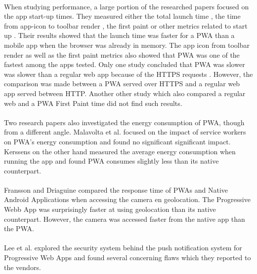\documentclass{kththesis}
\begin{document}
\paragraph{}
When studying performance, a large portion of the researched papers focused on the app start-up times. They measured either the total launch time\cite{YbergViktor2018NPaU} \cite{PWApossibleUnifer} \cite{Biorn-Hansen2}, the time from app-icon to toolbar render \cite{PWApossibleUnifer} \cite{Biorn-Hansen2}, the first paint \cite{bac_pwa_comparison} \cite{bac_pwa_performance} \cite{PWAapplicability} or other metrics related to start up \cite{bac_pwa_performance} \cite{bac_pwa_comparison}.
Their results showed that the launch time was faster for a PWA than a mobile app when the browser was already in memory. The app icon from toolbar render as well as the first paint metrics also showed that PWA was one of the fastest among the apps tested.\newline
Only one study concluded that PWA was slower was slower than a regular web app because of the HTTPS requests \cite{bac_pwa_comparison}. However, the comparison was made between a PWA served over HTTPS and a regular web app served between HTTP. Another other study \cite{bac_pwa_performance} which also compared a regular web and a PWA First Paint time did not find such results. 

\paragraph{}
Two research papers also investigated the energy consumption of PWA, though from a different angle. Malavolta et al.\cite{SW_and_energy} focused on the impact of service workers on PWA's energy consumption and found no significant significant impact. Kerssens \cite{PWAapplicability} on the other hand measured the average energy consumption when running the app and found PWA consumes slightly less than its native counterpart. 

\paragraph{}
Fransson and Driaguine \cite{PWAbc_responsetime} compared the response time of PWAs and Native Android Applications when accessing the camera en geolocation. The Progressive Webb App was surprisingly faster at using geolocation than its native counterpart. However, the camera was accessed faster from the native app than the PWA.

\paragraph{}
Lee et al. \cite{Pride_Prejudice} explored the security system behind the push notification system for Progressive Web Apps and found several concerning flaws which they reported to the vendors. 
\end{document}
